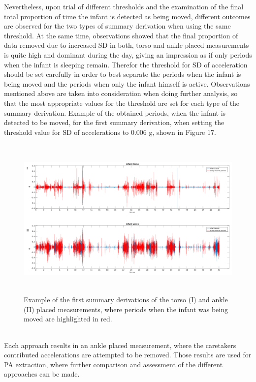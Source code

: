 \documentclass{article}
\begin{document}
{Nevertheless, upon trial of different thresholds and the examination of the final total proportion of time the infant is detected as being moved, different outcomes are observed for the two types of summary derivation when using the same threshold. At the same time, observations showed that the final proportion of data removed due to increased SD in both, torso and ankle placed measurements is quite high and dominant during the day, giving an impression as if only periods when the infant is sleeping remain. Therefor the threshold for SD of acceleration should be set carefully in order to best separate the periods when the infant is being moved and the periods when only the infant himself is active. Observations mentioned above are taken into consideration when doing further analysis, so that the most appropriate values for the threshold are set for each type of the summary derivation. Example of the obtained periods, when the infant is detected to be moved, for the first summary derivation, when setting the threshold value for SD of accelerations to 0.006 g, shown in Figure 17.
\begin{figure}[h]
\includegraphics[width=15cm, height=8cm]{example_approach_E.png}
\caption{Example of the first summary derivations of the torso (I) and ankle (II) placed measurements, where periods when the infant was being moved are highlighted in red.}
\end{figure}
\\Each approach results in an ankle placed measurement, where the caretakers contributed accelerations are attempted to be removed. Those results are used for PA extraction, where further comparison and assessment of the different approaches can be made.
\newpage
}
\end{document}
